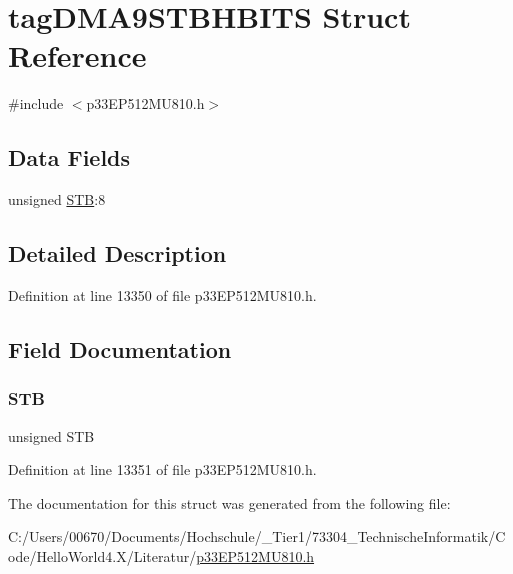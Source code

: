 \hypertarget{structtag_d_m_a9_s_t_b_h_b_i_t_s}{}\section{tag\+D\+M\+A9\+S\+T\+B\+H\+B\+I\+TS Struct Reference}
\label{structtag_d_m_a9_s_t_b_h_b_i_t_s}


{\ttfamily \#include $<$p33\+E\+P512\+M\+U810.\+h$>$}

\subsection*{Data Fields}
\begin{DoxyCompactItemize}
\item 
unsigned \hyperlink{structtag_d_m_a9_s_t_b_h_b_i_t_s_a9bd043a4db27e09b5035a563a8758fe7}{S\+TB}\+:8
\end{DoxyCompactItemize}


\subsection{Detailed Description}


Definition at line 13350 of file p33\+E\+P512\+M\+U810.\+h.



\subsection{Field Documentation}
\mbox{\label{structtag_d_m_a9_s_t_b_h_b_i_t_s_a9bd043a4db27e09b5035a563a8758fe7}} 
\subsubsection{\texorpdfstring{S\+TB}{STB}}
{\footnotesize\ttfamily unsigned S\+TB}



Definition at line 13351 of file p33\+E\+P512\+M\+U810.\+h.



The documentation for this struct was generated from the following file\+:\begin{DoxyCompactItemize}
\item 
C\+:/\+Users/00670/\+Documents/\+Hochschule/\+\_\+\+Tier1/73304\+\_\+\+Technische\+Informatik/\+Code/\+Hello\+World4.\+X/\+Literatur/\hyperlink{p33_e_p512_m_u810_8h}{p33\+E\+P512\+M\+U810.\+h}\end{DoxyCompactItemize}
